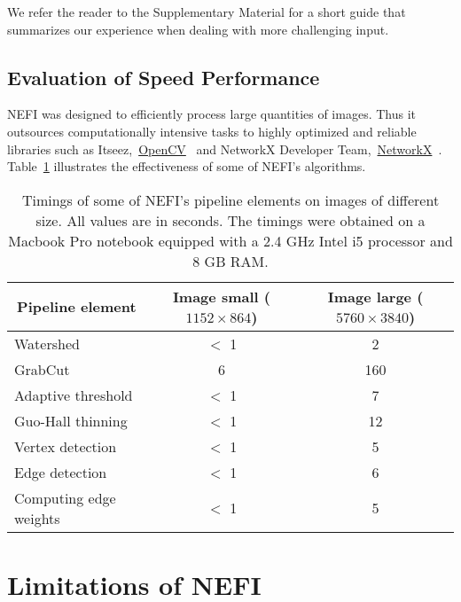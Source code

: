 		We refer the reader to the Supplementary Material for a short guide that summarizes our experience when dealing with more challenging input.

	\subsection{Evaluation of Speed Performance}

		NEFI was designed to efficiently process large quantities of images. Thus it outsources computationally intensive tasks to highly optimized and reliable libraries such as Itseez,~\href{http://opencv.org/}{OpenCV}~\cite{opencv} and NetworkX Developer Team,~\href{https://networkx.github.io/documentation/latest/index.html}{NetworkX}~\cite{networkx}. Table~\ref{tab:timings} illustrates the effectiveness of some of NEFI's algorithms. 


		\begin{table}
			\centering
			\begin{tabular}{@{} l *2c @{}}
			\toprule
			\multicolumn{1}{c}{Pipeline element}    & Image small ($1152 \times 864$)  & Image large ($5760 \times 3840$) \\ 
			\midrule
			Watershed & $<$ 1  & 2  \\
			GrabCut  & 6  & 160  \\
			Adaptive threshold & $<$ 1  & 7  \\
			Guo-Hall thinning &  $<$ 1  & 12  \\
			Vertex detection & $<$ 1  & 5  \\
			Edge detection & $<$ 1   & 6  \\
			Computing edge weights & $<$ 1  & 5 \\
			\bottomrule
			\end{tabular}
			\caption[Timings of NEFI's pipeline elements]{Timings of some of NEFI's pipeline elements on images of different size. All values are in seconds. The timings were obtained on a Macbook Pro notebook equipped with a 2.4 GHz Intel i5 processor and 8 GB RAM.}
			\label{tab:timings}
		\end{table}

\section{Limitations of NEFI}

